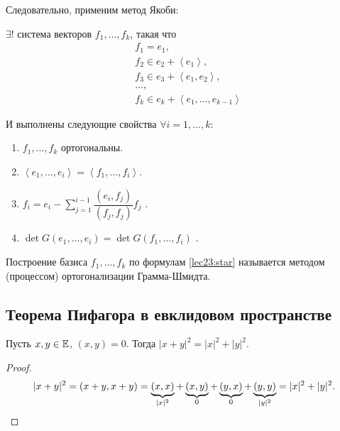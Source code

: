 \bigskip
Следовательно, применим метод Якоби:

$\exists!$ система векторов $f_1, \dots, f_k$, такая что 
\begin{align*}
&f_1 = e_1, \\
&f_2 \in e_2 + \left< e_1 \right>, \\
&f_3 \in e_3 + \left< e_1, e_2 \right>, \\
&\dots, \\
&f_k \in e_k + \left< e_1, \dots, e_{k - 1} \right>
\end{align*}


И выполнены следующие свойства $\forall i = 1, \dots, k$:

\begin{enumerate}[start=0,nosep]
\item $f_1, \dots, f_k$ ортогональны.
\item $\left< e_1, \dots, e_i \right> = \left< f_1, \dots, f_i \right>$.
\item $f_i = e_i - \sum_{j = 1}^{i - 1} \dfrac{(e_i, f_j)}{(f_j, f_j)} f_j$ .
\item $\det G(e_1, \dots, e_i) = \det G(f_1, \dots, f_i)$ .
\end{enumerate}

\bigskip
Построение базиса $f_1, \dots, f_k$ по формулам \ref{lec23:star} называется методом (процессом) ортогонализации Грамма-Шмидта.

\begin{comment}
    Свойство 2) говорит, что 
    \begin{equation*}
        f_i = e_i - \pr_{\left< f_1, \dots, f_{i - 1}\right>} e_i = \ort_{\left< f_1, \dots, f_{i - 1} \right>} e_i
    .\end{equation*}
\end{comment}


\subsection{Теорема Пифагора в евклидовом пространстве}

\begin{theorem}
    Пусть $x, y \in \mathbb{E}$, $(x, y) = 0$. Тогда $|x + y|^2 = |x|^2 + |y|^2$.
\end{theorem}

\begin{proof}
    \begin{equation*}
        |x + y|^2 = (x + y, x + y) = \underbrace{(x, x)}_{|x|^2} + \underbrace{(x, y)}_{0} + \underbrace{(y, x)}_{0} + \underbrace{(y, y)}_{|y|^2} = |x|^2 + |y|^2
    .\qedhere\end{equation*}
\end{proof}


